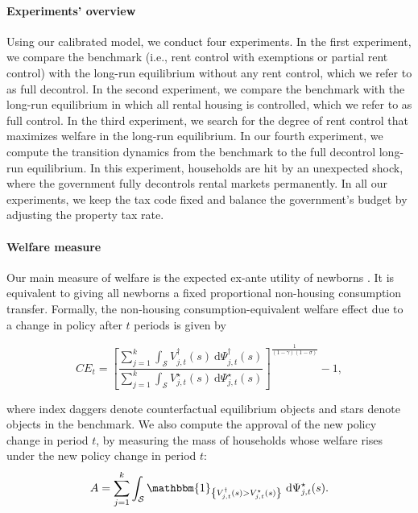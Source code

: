 \documentclass[parskip=full]{article}
\newcommand{\indicator}[1]{\mathbbm{1}_{\left\{ {#1} \right\} }}
\begin{document}
\paragraph{Experiments' overview} Using our calibrated model, we conduct four experiments. In the first experiment, we compare the benchmark (i.e., rent control with exemptions or partial rent control) with the long-run equilibrium without any rent control, which we refer to as full decontrol. In the second experiment, we compare the benchmark with the long-run equilibrium in which all rental housing is controlled, which we refer to as full control. In the third experiment, we search for the degree of rent control that maximizes welfare in the long-run equilibrium. In our fourth experiment, we compute the transition dynamics from the benchmark to the full decontrol long-run equilibrium. In this experiment, households are hit by an unexpected shock, where the government fully decontrols rental markets permanently. In all our experiments, we keep the tax code fixed and balance the government's budget by adjusting the property tax rate. 

\paragraph{Welfare measure} Our main measure of welfare is the expected ex-ante utility of newborns \citep{ralws-1971,conesa-et-al,gkkoc}. It is equivalent to giving all newborns a fixed proportional non-housing consumption transfer. Formally, the non-housing consumption-equivalent welfare effect due to a change in policy after $t$ periods is given by

\begin{equation*}
  CE_{t} = \left[\frac{\sum_{j=1}^{k}\int_{\mathcal{S}}V^{\dagger}_{j,t}(s)\ \mathrm{d}\Psi^{\dagger}_{j,t}(s)}{\sum_{j=1}^{k}\int_{\mathcal{S}}V^{\star}_{j,t}(s)\ \mathrm{d}\Psi^{\star}_{j,t}(s)}\right]^{\frac{1}{(1-\gamma)(1-\sigma)}}-1,
\end{equation*}

\noindent where index daggers denote counterfactual equilibrium objects and stars denote objects in the benchmark. We also compute the approval of the new policy change in period $t$, by measuring the mass of households whose welfare rises under the new policy change in period $t$:
\begin{equation*}
A = \sum_{j=1}^{k}\int_{\mathcal{S}} \indicator{V^{\dagger}_{j,t}(s)>V^{\star}_{j,t}(s)}\ \mathrm{d}\Psi^{\star}_{j,t}(s).
\end{equation*}
\end{document}
